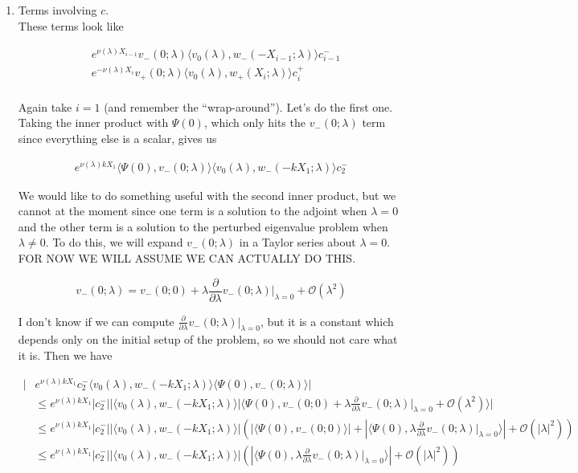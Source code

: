 \documentclass[12pt]{article}
\begin{document}
\begin{enumerate}
\item Terms involving $c$.\\

These terms look like

\begin{align*}
&e^{\nu(\lambda)X_{i-1}} v_-(0; \lambda) \langle v_0(\lambda), w_-(-X_{i-1}; \lambda) \rangle c_{i-1}^- \\
&e^{-\nu(\lambda)X_i} v_+(0; \lambda) \langle v_0(\lambda), w_+(X_i; \lambda) \rangle c_i^+ \\
\end{align*}

Again take $i = 1$ (and remember the ``wrap-around''). Let's do the first one. Taking the inner product with $\Psi(0)$, which only hits the $v_-(0; \lambda)$ term since everything else is a scalar, gives us 

\begin{align*}
e^{\nu(\lambda)k X_1} \langle \Psi(0), v_-(0; \lambda) \rangle \langle v_0(\lambda), w_-(-k X_1; \lambda) \rangle c_2^- 
\end{align*}

We would like to do something useful with the second inner product, but we cannot at the moment since one term is a solution to the adjoint when $\lambda = 0$ and the other term is a solution to the perturbed eigenvalue problem when $\lambda \neq 0$. To do this, we will expand $v_-(0; \lambda)$ in a Taylor series about $\lambda = 0$. FOR NOW WE WILL ASSUME WE CAN ACTUALLY DO THIS.

\[
v_-(0; \lambda) = v_-(0; 0) + \lambda \frac{\partial}{\partial \lambda}v_-(0; \lambda)\Big|_{\lambda = 0} + \mathcal{O}(\lambda^2)
\]

I don't know if we can compute $\frac{\partial}{\partial \lambda}v_-(0; \lambda)\Big|_{\lambda = 0}$, but it is a constant which depends only on the initial setup of the problem, so we should not care what it is. Then we have

\begin{align*}
|&e^{\nu(\lambda)k X_1} c_2^- \langle v_0(\lambda), w_-(-k X_1; \lambda) \rangle \langle \Psi(0), v_-(0; \lambda) \rangle|\\
&\leq e^{\nu(\lambda)k X_1}|c_2^-| |\langle v_0(\lambda), w_-(-k X_1; \lambda) \rangle|\langle \Psi(0), v_-(0; 0) + \lambda \frac{\partial}{\partial \lambda}v_-(0; \lambda)\Big|_{\lambda = 0} + \mathcal{O}(\lambda^2) \rangle| \\
&\leq e^{\nu(\lambda)k X_1}|c_2^-| |\langle v_0(\lambda), w_-(-k X_1; \lambda) \rangle| \left( |\langle \Psi(0), v_-(0; 0) \rangle| +  |\langle \Psi(0), \lambda \frac{\partial}{\partial \lambda}v_-(0; \lambda)\Big|_{\lambda = 0} \rangle| + \mathcal{O}(|\lambda|^2) \right) \\
&\leq e^{\nu(\lambda)k X_1}|c_2^-| |\langle v_0(\lambda), w_-(-k X_1; \lambda) \rangle| \left( |\langle \Psi(0), \lambda \frac{\partial}{\partial \lambda}v_-(0; \lambda)\Big|_{\lambda = 0} \rangle| + \mathcal{O}(|\lambda|^2) \right)
\end{align*}


\end{enumerate}
\end{document}
